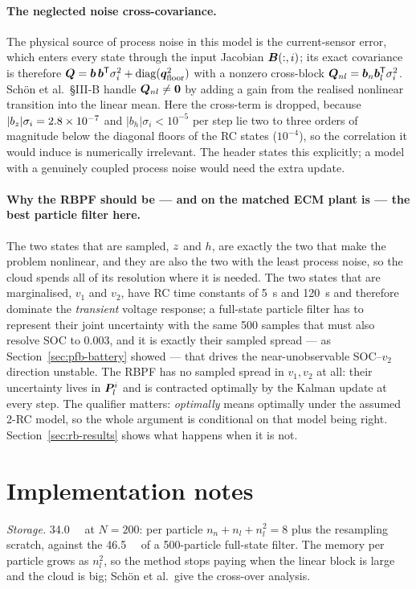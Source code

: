 \paragraph{The neglected noise cross-covariance.}
The physical source of process noise in this model is the current-sensor error, which enters every
state through the input Jacobian $\bm{B}(:,i)$; its exact covariance is therefore
$\bm{Q} = \bm b\,\bm b^{\mathsf{T}} \sigma_i^2 + \operatorname{diag}(\bm q_{\mathrm{floor}}^2)$ with a nonzero cross-block
$\bm{Q}_{nl} = \bm b_n \bm b_l^{\mathsf{T}} \sigma_i^2$.  Schön et al.\ \S{}III-B handle $\bm{Q}_{nl}\neq \bm 0$ by
adding a gain from the realised nonlinear transition into the linear mean.  Here the cross-term is
dropped, because $|b_{z}|\sigma_i = \num{2.8e-7}$ and $|b_h|\sigma_i < 10^{-5}$ per step lie two
to three orders of magnitude below the diagonal floors of the RC states ($10^{-4}$), so the
correlation it would induce is numerically irrelevant.  The header states this explicitly; a model
with a genuinely coupled process noise would need the extra update.

\paragraph{Why the RBPF should be --- and on the matched ECM plant is --- the best particle filter here.}
The two states that are sampled, $z$ and $h$, are exactly the two that make the problem
nonlinear, and they are also the two with the least process noise, so the cloud spends all of its
resolution where it is needed.  The two states that are marginalised, $v_1$ and $v_2$, have RC time
constants of \SI{5}{\second} and \SI{120}{\second} and therefore dominate the \emph{transient}
voltage response; a full-state particle filter has to represent their joint uncertainty with the
same 500 samples that must also resolve SOC to \num{0.003}, and it is exactly their sampled
spread --- as Section~\ref{sec:pfb-battery} showed --- that drives the near-unobservable
SOC--$v_2$ direction unstable.  The RBPF has no sampled spread in $v_1,v_2$ at all: their
uncertainty lives in $\bm{P}_l^i$ and is contracted optimally by the Kalman update at every step.
The qualifier matters: \emph{optimally} means optimally under the assumed 2-RC model, so the whole
argument is conditional on that model being right.  Section~\ref{sec:rb-results} shows what happens
when it is not.

\section{Implementation notes}
\emph{Storage.}  \SI{34.0}{\kilo\byte} at $N=200$: per particle $n_n + n_l + n_l^2 = 8$ 
plus the resampling scratch, against the \SI{46.5}{\kilo\byte} of a 500-particle full-state filter.
The memory per particle grows as $n_l^2$, so the method stops paying when the linear block is large
and the cloud is big; Schön et al.\ give the cross-over analysis.

